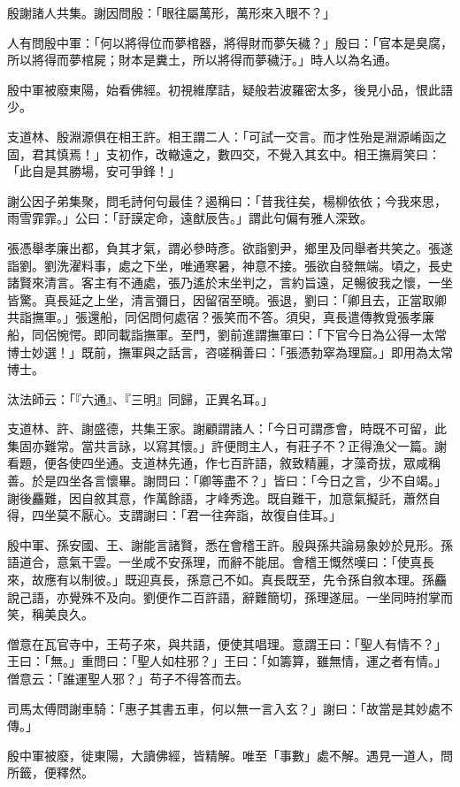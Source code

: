 殷謝諸人共集。謝因問殷：「眼往屬萬形，萬形來入眼不？」

人有問殷中軍：「何以將得位而夢棺器，將得財而夢矢穢？」殷曰：「官本是臭腐，所以將得而夢棺屍；財本是糞土，所以將得而夢穢汙。」時人以為名通。

殷中軍被廢東陽，始看佛經。初視維摩詰，疑般若波羅密太多，後見小品，恨此語少。

支道林、殷淵源俱在相王許。相王謂二人：「可試一交言。而才性殆是淵源崤函之固，君其慎焉！」支初作，改轍遠之，數四交，不覺入其玄中。相王撫肩笑曰：「此自是其勝場，安可爭鋒！」

謝公因子弟集聚，問毛詩何句最佳？遏稱曰：「昔我往矣，楊柳依依；今我來思，雨雪霏霏。」公曰：「訏謨定命，遠猷辰告。」謂此句偏有雅人深致。

張憑舉孝廉出都，負其才氣，謂必參時彥。欲詣劉尹，鄉里及同舉者共笑之。張遂詣劉。劉洗濯料事，處之下坐，唯通寒暑，神意不接。張欲自發無端。頃之，長史諸賢來清言。客主有不通處，張乃遙於末坐判之，言約旨遠，足暢彼我之懷，一坐皆驚。真長延之上坐，清言彌日，因留宿至曉。張退，劉曰：「卿且去，正當取卿共詣撫軍。」張還船，同侶問何處宿？張笑而不答。須臾，真長遣傳教覓張孝廉船，同侶惋愕。即同載詣撫軍。至門，劉前進謂撫軍曰：「下官今日為公得一太常博士妙選！」既前，撫軍與之話言，咨嗟稱善曰：「張憑勃窣為理窟。」即用為太常博士。

汰法師云：「『六通』、『三明』同歸，正異名耳。」

支道林、許、謝盛德，共集王家。謝顧謂諸人：「今日可謂彥會，時既不可留，此集固亦難常。當共言詠，以寫其懷。」許便問主人，有莊子不？正得漁父一篇。謝看題，便各使四坐通。支道林先通，作七百許語，敘致精麗，才藻奇拔，眾咸稱善。於是四坐各言懷畢。謝問曰：「卿等盡不？」皆曰：「今日之言，少不自竭。」謝後麤難，因自敘其意，作萬餘語，才峰秀逸。既自難干，加意氣擬託，蕭然自得，四坐莫不厭心。支謂謝曰：「君一往奔詣，故復自佳耳。」

殷中軍、孫安國、王、謝能言諸賢，悉在會稽王許。殷與孫共論易象妙於見形。孫語道合，意氣干雲。一坐咸不安孫理，而辭不能屈。會稽王慨然嘆曰：「使真長來，故應有以制彼。」既迎真長，孫意己不如。真長既至，先令孫自敘本理。孫麤說己語，亦覺殊不及向。劉便作二百許語，辭難簡切，孫理遂屈。一坐同時拊掌而笑，稱美良久。

僧意在瓦官寺中，王苟子來，與共語，便使其唱理。意謂王曰：「聖人有情不？」王曰：「無。」重問曰：「聖人如柱邪？」王曰：「如籌算，雖無情，運之者有情。」僧意云：「誰運聖人邪？」苟子不得答而去。

司馬太傅問謝車騎：「惠子其書五車，何以無一言入玄？」謝曰：「故當是其妙處不傳。」

殷中軍被廢，徙東陽，大讀佛經，皆精解。唯至「事數」處不解。遇見一道人，問所籤，便釋然。

